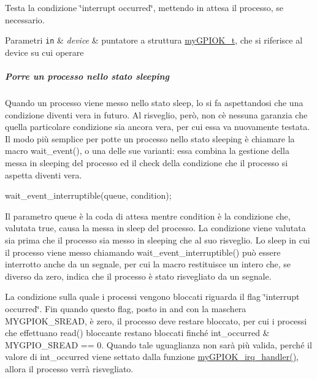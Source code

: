 Testa la condizione \char`\"{}interrupt occurred\char`\"{}, mettendo in attesa il processo, se necessario. 


\begin{DoxyParams}[1]{Parametri}
\mbox{\tt in}  & {\em device} & puntatore a struttura \hyperlink{structmy_g_p_i_o_k__t}{my\+G\+P\+I\+O\+K\+\_\+t}, che si riferisce al device su cui operare\\
\hline
\end{DoxyParams}
\subparagraph*{Porre un processo nello stato sleeping}

Quando un processo viene messo nello stato sleep, lo si fa aspettandosi che una condizione diventi vera in futuro. Al risveglio, però, non c\textquotesingle{}è nessuna garanzia che quella particolare condizione sia ancora vera, per cui essa va nuovamente testata. Il modo più semplice per potte un processo nello stato sleeping è chiamare la macro wait\+\_\+event(), o una delle sue varianti\+: essa combina la gestione della messa in sleeping del processo ed il check della condizione che il processo si aspetta diventi vera. 
\begin{DoxyCode}
wait\_event\_interruptible(queue, condition);
\end{DoxyCode}
 Il parametro queue è la coda di attesa mentre condition è la condizione che, valutata true, causa la messa in sleep del processo. La condizione viene valutata sia prima che il processo sia messo in sleeping che al suo risveglio. Lo sleep in cui il processo viene messo chiamando wait\+\_\+event\+\_\+interruptible() può essere interrotto anche da un segnale, per cui la macro restituisce un intero che, se diverso da zero, indica che il processo è stato risvegliato da un segnale.

La condizione sulla quale i processi vengono bloccati riguarda il flag \char`\"{}interrupt occurred\char`\"{}. Fin quando questo flag, posto in and con la maschera M\+Y\+G\+P\+I\+O\+K\+\_\+\+S\+R\+E\+AD, è zero, il processo deve restare bloccato, per cui i processi che effettuano read() bloccante restano bloccati finché int\+\_\+occurred \& M\+Y\+G\+P\+I\+O\+\_\+\+S\+R\+E\+AD == 0. Quando tale uguaglianza non sarà più valida, perché il valore di int\+\_\+occurred viene settato dalla funzione \hyperlink{group___linux-_driver_ga2fc230a12a97aa63e43b2dc4aec73511}{my\+G\+P\+I\+O\+K\+\_\+irq\+\_\+handler()}, allora il processo verrà risvegliato. \mbox{\label{group___linux-_driver_gae182aa943af08c102a05795ae8526192}} 
